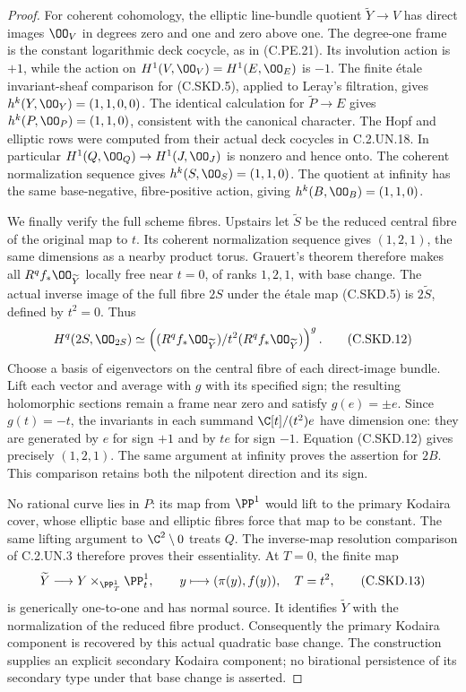 \begin{proof}
For coherent cohomology, the elliptic
line-bundle quotient $\widetilde Y\to V$
has direct images $\OO_V$ in degrees
zero and one and zero above one. The
degree-one frame is the constant
logarithmic deck cocycle, as in
(C.PE.21). Its involution action is
$+1$, while the action on
$H^1(V,\OO_V)=H^1(E,\OO_E)$ is $-1$.
The finite \'etale invariant-sheaf
comparison for (C.SKD.5), applied to
Leray's filtration, gives
$h^k(Y,\OO_Y)=(1,1,0,0)$. The identical
calculation for $\widetilde P\to E$
gives $h^k(P,\OO_P)=(1,1,0)$, consistent
with the canonical character.
The Hopf and elliptic rows were
computed from their actual deck cocycles
in C.2.UN.18. In particular
$H^1(Q,\OO_Q)\to H^1(J,\OO_J)$ is
nonzero and hence onto. The coherent
normalization sequence gives
$h^k(S,\OO_S)=(1,1,0)$. The quotient
at infinity has the same base-negative,
fibre-positive action, giving
$h^k(B,\OO_B)=(1,1,0)$.

We finally verify the full scheme fibres.
Upstairs let $\widetilde S$ be the
reduced central fibre of the original
map to $t$. Its coherent normalization
sequence gives $(1,2,1)$, the same
dimensions as a nearby product torus.
Grauert's theorem therefore makes all
$R^qf_*\OO_{\widetilde Y}$ locally free
near $t=0$, of ranks $1,2,1$, with
base change. The actual inverse image
of the full fibre $2S$ under the
\'etale map (C.SKD.5) is $2\widetilde S$,
defined by $t^2=0$. Thus
\[
 H^q(2S,\OO_{2S})
  \simeq
 \left((R^qf_*\OO_{\widetilde Y})/
                   t^2(R^qf_*\OO_{\widetilde Y})\right)^g .
                                                            \tag{C.SKD.12}
\]
Choose a basis of eigenvectors on the
central fibre of each direct-image
bundle. Lift each vector and average
with $g$ with its specified sign; the
resulting holomorphic sections remain
a frame near zero and satisfy
$g(e)=\pm e$. Since $g(t)=-t$, the
invariants in each summand
$\C[t]/(t^2)e$ have dimension one:
they are generated by $e$ for sign
$+1$ and by $te$ for sign $-1$.
Equation (C.SKD.12) gives precisely
$(1,2,1)$. The same argument at
infinity proves the assertion for
$2B$. This comparison retains both
the nilpotent direction and its sign.

No rational curve lies in $P$:
its map from $\PP^1$ would lift to
the primary Kodaira cover, whose
elliptic base and elliptic fibres
force that map to be constant.
The same lifting argument to
$\C^2\setminus0$ treats $Q$.
The inverse-map resolution comparison
of C.2.UN.3 therefore proves their
essentiality. At $T=0$, the finite
map
\[
 \widetilde Y\longrightarrow
             Y\times_{\PP^1_T}\PP^1_t,\qquad
 y\longmapsto(\pi(y),f(y)),\quad T=t^2,
                                                            \tag{C.SKD.13}
\]
is generically one-to-one and has
normal source. It identifies
$\widetilde Y$ with the normalization
of the reduced fibre product.
Consequently the primary Kodaira
component is recovered by this
actual quadratic base change.
The construction supplies an
explicit secondary Kodaira component;
no birational persistence of its
secondary type under that base change
is asserted.
\end{proof}
